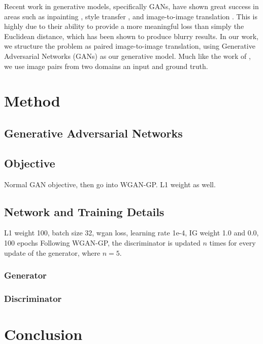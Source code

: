 \documentclass[conference]{IEEEtran}
\begin{document}
Recent work in generative models, specifically GANs, have shown great success
in areas such as inpainting \cite{pathak2016context}, style transfer \cite{Gatys_2016_CVPR}, and image-to-image
translation \cite{isola2016image,zhu2017unpaired}. This is highly due to their ability to provide a more meaningful
loss than simply the Euclidean distance, which has been shown to produce blurry results. In our work, we structure
the problem as paired image-to-image translation, using Generative Adversarial Networks (GANs) as our generative model.
Much like the work of \cite{isola2016image}, we use image pairs from two domains an input and ground truth.

\section{Method}



\subsection{Generative Adversarial Networks}



\subsection{Objective}
Normal GAN objective, then go into WGAN-GP. L1 weight as well.

\subsection{Network and Training Details}

L1 weight 100, batch size 32, wgan loss, learning rate 1e-4, IG weight 1.0 and 0.0, 100 epochs
Following WGAN-GP, the discriminator is updated $n$ times for every update of the generator, where $n = 5$.

\subsubsection{Generator}



\subsubsection{Discriminator}



\section{Conclusion}
\end{document}
